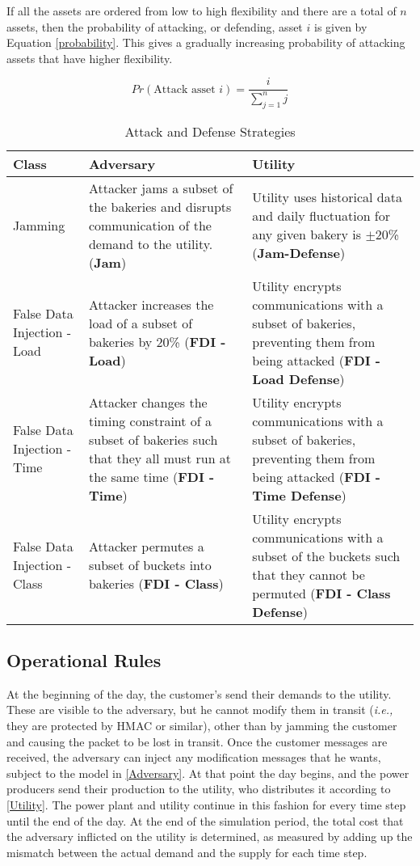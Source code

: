\documentclass[conference]{IEEEtran}
\newcommand{\ie}{\emph{i.e.,}\xspace}
\begin{document}
If all the assets are ordered from low to high flexibility and there are a total of $n$ assets, then the probability of attacking, or defending, asset $i$ is given by Equation \ref{probability}. This gives a gradually increasing probability of attacking assets that have higher flexibility. 

\begin{equation}
\label{probability}
Pr(\text{Attack asset } i) = \frac{i}{\sum\limits_{j=1}^n j}
\end{equation}


\begin{table}[!htbp]
\label{strategies}
\centering
\begin{tabular}{p{2cm} | p{3cm} | p{3cm}}
\toprule
Class & Adversary & Utility\\
\midrule
Jamming & Attacker jams a subset of the bakeries and disrupts communication of the demand to the utility. ({\bf Jam}) & Utility uses historical data and daily fluctuation for any given bakery is $\pm$20\%  ({\bf Jam-Defense})\\
False Data Injection - Load &  Attacker increases the load of a subset of bakeries by 20\% ({\bf FDI - Load}) & Utility encrypts communications with a subset of bakeries, preventing them from being attacked ({\bf FDI - Load Defense}) \\
False Data Injection - Time & Attacker changes the timing constraint of a subset of bakeries such that they all must run at the same time ({\bf FDI - Time}) & Utility encrypts communications with a subset of bakeries, preventing them from being attacked ({\bf FDI - Time Defense})\\
False Data Injection - Class & Attacker permutes a subset of buckets into bakeries ({\bf FDI - Class}) & Utility encrypts communications with a subset of the buckets such that they cannot be permuted ({\bf FDI - Class Defense})\\
\bottomrule
\end{tabular}
\caption{Attack and Defense Strategies}
\end{table}

\subsection{Operational Rules}
\label{Rules}

At the beginning of the day, the customer's send their demands to the utility. These are visible to the adversary, but he cannot modify them in transit (\ie they are protected by HMAC or similar), other than by jamming the customer and causing the packet to be lost in transit.   Once the customer messages are received, the adversary can inject any modification messages that he wants, subject to the model in \ref{Adversary}. At that point the day begins, and the power producers send their production to the utility, who distributes it according to \ref{Utility}. The power plant and utility continue in this fashion for every time step until the end of the day. At the end of the simulation period, the total cost that the adversary inflicted
on the utility is determined, as measured by adding up the mismatch between the actual demand and the supply for each time step. 
\end{document}
